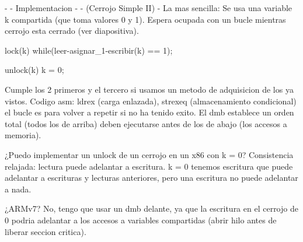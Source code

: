 - - Implementacion - -  (Cerrojo Simple II)
- La mas sencilla: Se usa una variable k compartida (que toma valores 0 y 1).
Espera ocupada con un bucle mientras cerrojo esta cerrado (ver diapositiva).

lock(k){
    while(leer-asignar_1-escribir(k) == 1){};
}

unlock(k){
    k = 0;
}

Cumple los 2 primeros y el tercero si usamos un metodo de adquisicion de los ya vistos.
Codigo asm: ldrex (carga enlazada), strexeq (almacenamiento condicional) el bucle es para volver a repetir si no ha tenido exito. El dmb establece un orden total (todos los de arriba) deben ejecutarse antes de los de abajo (los accesos a memoria).


¿Puedo implementar un unlock de un cerrojo en un x86 con k = 0?
Consistencia relajada: lectura puede adelantar a escritura.
k = 0 tenemos escritura que puede adelantar a escrituras y lecturas anteriores, pero una escritura no puede adelantar a nada.

¿ARMv7?
No, tengo que usar un dmb delante, ya que la escritura en el cerrojo de 0 podria adelantar a los accesos a variables compartidas (abrir hilo antes de liberar seccion critica).
